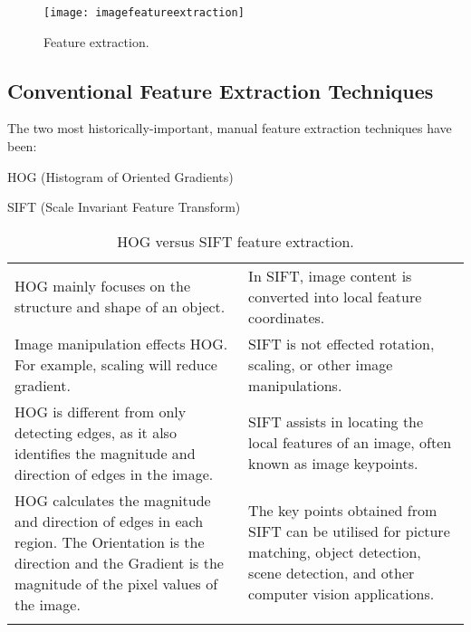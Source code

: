 	\begin{figure}[htb]
		\centering
		\texttt{[image: imagefeatureextraction]}
		\caption[Feature extraction]{Feature extraction.}
		\label{fig:imagefeatureextraction}
	\end{figure}

	\subsection{Conventional Feature Extraction Techniques}
The two most historically-important, manual feature extraction techniques have been:
	\begin{bulletedlist}
		\item HOG (Histogram of Oriented Gradients)
		\item SIFT (Scale Invariant Feature Transform)
	\end{bulletedlist}

	\begin{table}
        \centering
        \caption[HOG versus SIFT feature extraction]{HOG versus SIFT feature extraction.}
        \label{tab:hogversussift}
		\begin{tabular}{|p{}|p{}|} \hline
				\tablecolumnheadervlinesone{HOG} & \tablecolumnheadervlinestwo{SIFT} \\ \hline
				HOG mainly focuses on the structure and shape of an object. &
	            In SIFT, image content is converted into local feature coordinates. \\ \hline
				Image manipulation effects HOG.  For example, scaling will reduce gradient. &
				SIFT is not effected rotation, scaling, or other image manipulations. \\ \hline
				HOG is different from only detecting edges, as it also identifies the magnitude and direction of edges in the image. &
	            SIFT assists in locating the local features of an image, often known as image keypoints. \\ \hline
				HOG calculates the magnitude and direction of edges in each region. The Orientation is the direction and the Gradient is the magnitude of the pixel values of the image. &
				The key points obtained from SIFT can be utilised for picture matching, object detection, scene detection, and other computer vision applications. \\ \hline
				\adjustbox{center}{\texttt{[image: hogfeaturedetection]}} &
				\adjustbox{center}{\texttt{[image: siftfeaturedetection]}} \\ \hline
		\end{tabular}
	\end{table}

